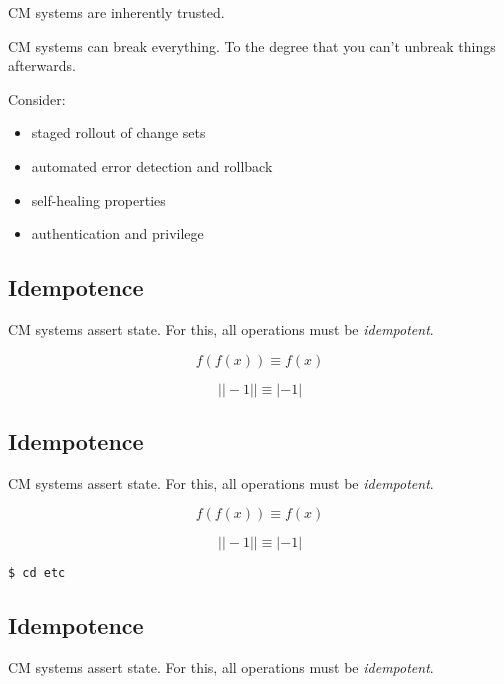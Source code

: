 \documentclass[xga]{xdvislides}
\begin{document}
CM systems are inherently trusted. \\
\vspace{.25in}

CM systems can break everything.  To the degree that
you can't unbreak things afterwards. \\
\vspace{.5in}

Consider:
\begin{itemize}
	\item staged rollout of change sets
	\item automated error detection and rollback
	\item self-healing properties
	\item authentication and privilege
\end{itemize}


\subsection{Idempotence}
CM systems assert state.  For this, all operations
must be {\em idempotent}. \\
\vspace{.5in}

\begin{displaymath}
f(f(x)) \equiv f(x)
\end{displaymath}

\begin{displaymath}
| |-1| | \equiv |-1|
\end{displaymath}

\subsection{Idempotence}
CM systems assert state.  For this, all operations
must be {\em idempotent}. \\
\vspace{.5in}

\begin{displaymath}
f(f(x)) \equiv f(x)
\end{displaymath}

\begin{displaymath}
| |-1| | \equiv |-1|
\end{displaymath}

\begin{verbatim}
$ cd etc
\end{verbatim}

\subsection{Idempotence}
CM systems assert state.  For this, all operations
must be {\em idempotent}. \\
\vspace{.5in}
\end{document}
